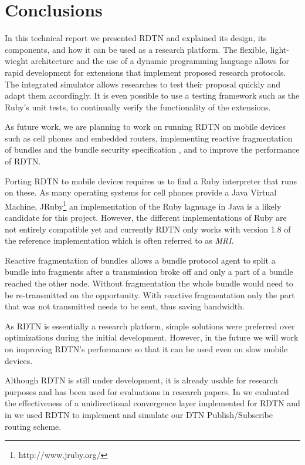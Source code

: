 \documentclass{article}
\begin{document}
\section{Conclusions}\label{sec.conclusions}

In this technical report we presented RDTN and explained its design, its
components, and how it can be used as a research platform. The flexible,
light-wieght architecture and the use of a dynamic programming language allows
for rapid development for extensions that implement proposed research protocols.
The integrated simulator allows researches to test their proposal quickly and
adapt them accordingly. It is even possible to use a testing framework such as
the Ruby's unit tests, to continually verify the functionality of the
extensions.

As future work, we are planning to work on running RDTN on mobile devices such
as cell phones and embedded routers, implementing reactive fragmentation of
bundles and the bundle security specification \cite{bundle-security}, and to
improve the performance of RDTN.

Porting RDTN to mobile devices requires us to find a Ruby interpreter that runs
on these. As many operating systems for cell phones provide a Java Virtual
Machine, JRuby\footnote{http://www.jruby.org/} an implementation of the Ruby
lagnuage in Java is a likely candidate for this project. However, the different
implementations of Ruby are not entirely compatible yet and currently RDTN only
works with version 1.8 of the reference implementation which is often referred
to as {\em MRI}.

Reactive fragmentation of bundles allows a bundle protocol agent to split a
bundle into fragments after a transmission broke off and only a part of a bundle
reached the other node. Without fragmentation the whole bundle would need to be
re-transmitted on the opportunity. With reactive fragmentation only the 
part that was not transmitted needs to be sent, thus saving bandwidth.

As RDTN is essentially a research platform, simple solutions were preferred over
optimizations during the initial development. However, in the future we will
work on improving RDTN's performance so that it can be used even on slow mobile
devices.

Although RDTN is still under development, it is already usable for research
purposes and has been used for evaluations in research papers.  In \cite{nsdr07}
we evaluated the effectiveness of a unidirectional convergence layer implemented
for RDTN and in \cite{dtn-pubsub} we used RDTN to implement and simulate our DTN
Publish/Subscribe routing scheme.


\end{document}
